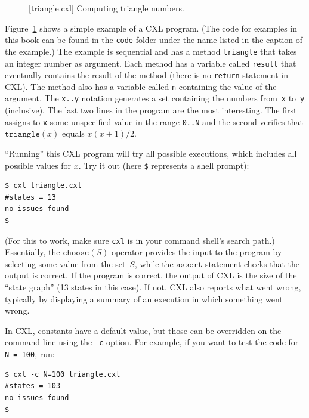 \documentclass{report}
\newenvironment{code}{
\tcolorbox
}{
\endtcolorbox
}
\begin{document}
\begin{figure}
\begin{code}
\end{code}
\caption{[triangle.cxl] Computing triangle numbers.}
\label{fig:triangle}
\end{figure}

Figure~\ref{fig:triangle} shows a simple example of a CXL program.
(The code for examples in this book can be found in the \texttt{code} folder under
the name listed in the caption of the example.)
The example is sequential and has a method \texttt{triangle} that takes
an integer number as argument.  Each method has a variable called
\texttt{result} that eventually contains the result of the
method (there is no \texttt{return} statement in CXL).  The method
also has a variable called \texttt{n} containing the value of the
argument.  The \texttt{x..y} notation generates a set containing the numbers
from~\texttt{x} to~\texttt{y} (inclusive).  The last two lines in the program are
the most interesting.
The first assigns to \texttt{x} some unspecified value in the range \texttt{0..N}
and the second verifies that $\mathtt{triangle}(x)$ equals $x(x+1)/2$.

``Running'' this CXL program will try all possible executions, which
includes all possible values for $x$.  Try it out (here \texttt{\$}
represents a shell prompt):

\begin{code}
\begin{verbatim}
$ cxl triangle.cxl
#states = 13
no issues found
$
\end{verbatim}
\end{code}

(For this to work, make sure \texttt{cxl} is in your command shell's search path.)
Essentially, the $\texttt{choose}(S)$
operator provides the input to the program by selecting some value from the
set~$S$, while the $\texttt{assert}$ statement checks that the output is
correct.  If the program is correct, the output of CXL is the size of the
``state graph'' (13 states in this case).  If not, CXL also
reports what went wrong, typically by displaying a summary of an execution in
which something went wrong.

In CXL, constants have a default value,
but those can be overridden on the command
line using the \texttt{-c} option.
For example, if you want to test the code for \texttt{N = 100}, run:
\begin{code}
\begin{verbatim}
$ cxl -c N=100 triangle.cxl
#states = 103
no issues found
$
\end{verbatim}
\end{code}
\end{document}
